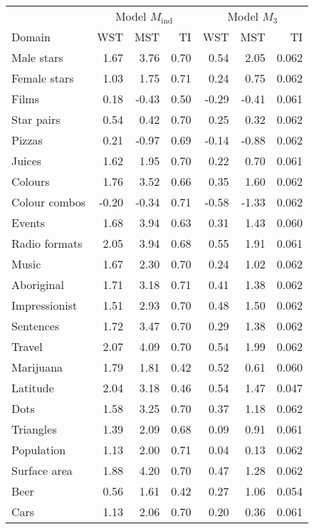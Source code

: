 
\begin{tabular}[t]{lrrrrrr}
\toprule
\multicolumn{1}{c}{ } & \multicolumn{3}{c}{Model $M_{\mathrm{ind}}$} & \multicolumn{3}{c}{Model $M_3$} \\
\cmidrule(l{3pt}r{3pt}){2-4} \cmidrule(l{3pt}r{3pt}){5-7}
Domain & WST & MST & TI & WST & MST & TI\\
\midrule
Male stars & 1.67 & 3.76 & 0.70 & 0.54 & 2.05 & 0.062\\
Female stars & 1.03 & 1.75 & 0.71 & 0.24 & 0.75 & 0.062\\
Films & 0.18 & -0.43 & 0.50 & -0.29 & -0.41 & 0.061\\
Star pairs & 0.54 & 0.42 & 0.70 & 0.25 & 0.32 & 0.062\\
Pizzas & 0.21 & -0.97 & 0.69 & -0.14 & -0.88 & 0.062\\
\addlinespace
Juices & 1.62 & 1.95 & 0.70 & 0.22 & 0.70 & 0.061\\
Colours & 1.76 & 3.52 & 0.66 & 0.35 & 1.60 & 0.062\\
Colour combos & -0.20 & -0.34 & 0.71 & -0.58 & -1.33 & 0.062\\
Events & 1.68 & 3.94 & 0.63 & 0.31 & 1.43 & 0.060\\
Radio formats & 2.05 & 3.94 & 0.68 & 0.55 & 1.91 & 0.061\\
\addlinespace
Music & 1.67 & 2.30 & 0.70 & 0.24 & 1.02 & 0.062\\
Aboriginal & 1.71 & 3.18 & 0.71 & 0.41 & 1.38 & 0.062\\
Impressionist & 1.51 & 2.93 & 0.70 & 0.48 & 1.50 & 0.062\\
Sentences & 1.72 & 3.47 & 0.70 & 0.29 & 1.38 & 0.062\\
Travel & 2.07 & 4.09 & 0.70 & 0.54 & 1.99 & 0.062\\
\addlinespace
Marijuana & 1.79 & 1.81 & 0.42 & 0.52 & 0.61 & 0.060\\
Latitude & 2.04 & 3.18 & 0.46 & 0.54 & 1.47 & 0.047\\
Dots & 1.58 & 3.25 & 0.70 & 0.37 & 1.18 & 0.062\\
Triangles & 1.39 & 2.09 & 0.68 & 0.09 & 0.91 & 0.061\\
Population & 1.13 & 2.00 & 0.71 & 0.04 & 0.13 & 0.062\\
\addlinespace
Surface area & 1.88 & 4.20 & 0.70 & 0.47 & 1.28 & 0.062\\
Beer & 0.56 & 1.61 & 0.42 & 0.27 & 1.06 & 0.054\\
Cars & 1.13 & 2.06 & 0.70 & 0.20 & 0.36 & 0.061\\

\end{tabular}
